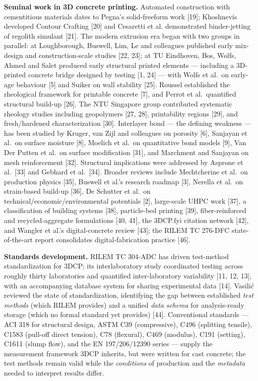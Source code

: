 \documentclass[
  11pt,
  letterpaper,
]{article}
\begin{document}
\textbf{Seminal work in 3D concrete printing.} Automated construction
with cementitious materials dates to Pegna's solid-freeform work
{[}19{]}; Khoshnevis developed Contour Crafting {[}20{]} and Cesaretti
et al. demonstrated binder-jetting of regolith simulant {[}21{]}. The
modern extrusion era began with two groups in parallel: at Loughborough,
Buswell, Lim, Le and colleagues published early mix-design and
construction-scale studies {[}22, 23{]}; at TU Eindhoven, Bos, Wolfs,
Ahmed and Salet produced early structural printed elements --- including
a 3D-printed concrete bridge designed by testing {[}1, 24{]} --- with
Wolfs et al.~on early-age behaviour {[}5{]} and Suiker on wall stability
{[}25{]}. Roussel established the rheological framework for printable
concrete {[}7{]}, and Perrot et al.~quantified structural build-up
{[}26{]}. The NTU Singapore group contributed systematic rheology
studies including geopolymers {[}27, 28{]}, printability regions
{[}29{]}, and fresh/hardened characterization {[}30{]}. Interlayer bond
--- the defining weakness --- has been studied by Kruger, van Zijl and
colleagues on porosity {[}6{]}, Sanjayan et al.~on surface moisture
{[}8{]}, Moelich et al.~on quantitative bond models {[}9{]}, Van Der
Putten et al.~on surface modification {[}31{]}, and Marchment and
Sanjayan on mesh reinforcement {[}32{]}. Structural implications were
addressed by Asprone et al.~{[}33{]} and Gebhard et al.~{[}34{]}.
Broader reviews include Mechtcherine et al.~on production physics
{[}35{]}, Buswell et al.'s research roadmap {[}3{]}, Nerella et al.~on
strain-based build-up {[}36{]}, De Schutter et al.~on
technical/economic/environmental potentials {[}2{]}, large-scale UHPC
work {[}37{]}, a classification of building systems {[}38{]},
particle-bed printing {[}39{]}, fiber-reinforced and recycled-aggregate
formulations {[}40, 41{]}, the 3DCP.fyi citation network {[}42{]}, and
Wangler et al.'s digital-concrete review {[}43{]}; the RILEM TC 276-DFC
state-of-the-art report consolidates digital-fabrication practice
{[}46{]}.

\textbf{Standards development.} RILEM TC 304-ADC has driven test-method
standardization for 3DCP; its interlaboratory study coordinated testing
across roughly thirty laboratories and quantified inter-laboratory
variability {[}11, 12, 13{]}, with an accompanying database system for
sharing experimental data {[}14{]}. Vasilić reviewed the state of
standardization, identifying the gap between established \emph{test
methods} (which RILEM provides) and a unified \emph{data schema} for
analysis-ready storage (which no formal standard yet provides) {[}44{]}.
Conventional standards --- ACI 318 for structural design, ASTM C39
(compressive), C496 (splitting tensile), C1583 (pull-off direct
tension), C78 (flexural), C469 (modulus), C191 (setting), C1611 (slump
flow), and the EN 197/206/12390 series --- supply the measurement
framework 3DCP inherits, but were written for cast concrete; the test
methods remain valid while the \emph{conditions} of production and the
\emph{metadata} needed to interpret results differ.
\end{document}
